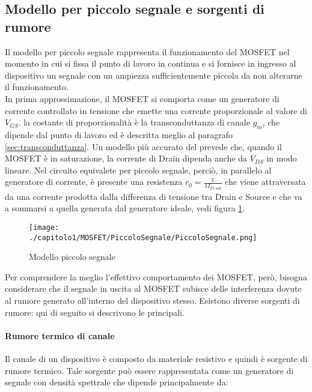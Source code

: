 \subsection{Modello per piccolo segnale e sorgenti di rumore}
Il modello per piccolo segnale rappresenta il funzionamento del MOSFET nel momento in cui si fissa il punto di lavoro in continua e si fornisce in ingresso al dispositivo un segnale con un ampiezza sufficientemente piccola da non alterarne il funzionamento. \\

In prima approssimazione, il MOSFET si comporta come un generatore di corrente controllato in tensione che emette una corrente proporzionale al valore di $V_{GS}$. la costante di proporzionalità è la transconduttanza di canale $g_m$, che dipende dal punto di lavoro ed è descritta meglio al paragrafo \ref{sec:transconduttanza}. Un modello più accurato del prevede che, quando il MOSFET è in saturazione, la corrente di Drain dipenda anche da $V_{DS}$ in modo lineare. Nel circuito equivalete per piccolo segnale, perciò, in parallelo al generatore di corrente, è presente una resistenza $r_0 = \frac{1}{\lambda I_{D,sat}}$ che viene attraversata da una corrente prodotta dalla differenza di tensione tra Drain e Source e che va a sommarsi a quella generata dal generatore ideale, vedi figura \ref{fig:piccolo_segnale}.\\

\begin{figure}[h!]
  
  \centering
  \texttt{[image: ./capitolo1/MOSFET/PiccoloSegnale/PiccoloSegnale.png]}
  \caption[Modello piccolo segnale]{Modello piccolo segnale}
  \label{fig:piccolo_segnale}

\end{figure}


Per comprendere la meglio l'effettivo comportamento dei MOSFET, però, bisogna considerare che il segnale in uscita al MOSFET subisce delle interferenza dovute al rumore generato all'interno del dispositivo stesso. Esistono diverse sorgenti di rumore: qui di seguito si descrivono le principali.

\paragraph*{Rumore termico di canale}
Il canale di un dispositivo è composto da materiale resistivo e quindi è sorgente di rumore termico. Tale sorgente può essere rappresentata come un generatore di segnale con densità spettrale che dipende principalmente da:

